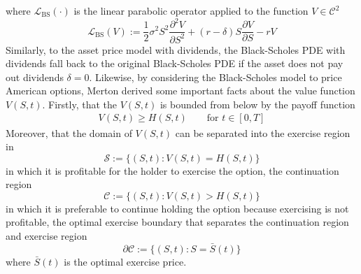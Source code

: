where $\mathcal{L}_{\text{BS}}(\cdot)$ is the linear parabolic operator applied to the function $V \in \mathcal{C}^2$
\begin{equation}
  \label{eq:blackscholes:preliminaries:linear_parabolic_operator}
  \mathcal{L}_{\text{BS}}(V) := \dfrac{1}{2}\sigma^{2} S^2 \dfrac{\partial^2{V}}{\partial{S^2}} + (r - \delta) S \dfrac{\partial{V}}{\partial{S}} - rV
\end{equation}
Similarly, to the asset price model with dividends, the Black-Scholes PDE with dividends fall back to the original Black-Scholes PDE if the asset does not pay out dividends $\delta = 0$. Likewise, by considering the Black-Scholes model to price American options, Merton \cite{merton_1973} derived some important facts about the value function $V(S,t)$. Firstly, that the $V(S,t)$ is bounded from below by the payoff function
\begin{align}
  \label{eq:blackscholes:american_options_price_lower_bound}
  V(S, t) \ge H(S, t) \qquad \text{for $t \in [0, T]$}
\end{align}
Moreover, that the domain of $V(S, t)$ can be separated into the exercise region in 
\begin{equation}
  \mathcal{S} := \{(S, t) : V(S, t) = H(S, t)\}
  \label{eq:blackscholes:preliminaries:exercise_region}
\end{equation}
in which it is profitable for the holder to exercise the option, the continuation region
\begin{equation}
  \label{eq:blackscholes:preliminaries:continuation_region}
  \mathcal{C} := \{(S, t) : V(S, t) > H(S, t)\}
\end{equation} 
in which it is preferable to continue holding the option because exercising is not profitable, the optimal exercise boundary that separates the continuation region and exercise region
\begin{equation}
  \label{eq:blackscholes:preliminaries:optimal_exercise_boundary}
  \partial \mathcal{C} := \{(S, t) : S = \bar{S}(t)\}
\end{equation}
where $\bar{S}(t)$ is the optimal exercise price. 
